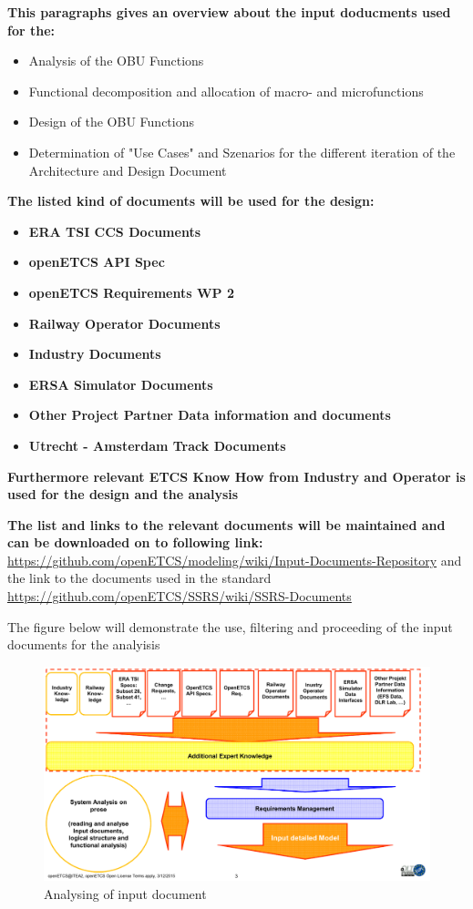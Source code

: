 \textbf{This paragraphs gives an overview about the input doducments used for the:}
\begin{itemize}
\item Analysis of the OBU Functions
\item Functional decomposition and allocation of macro- and microfunctions
\item Design of the OBU Functions
\item Determination of "Use Cases" and Szenarios for the different iteration of the Architecture and Design Document
\end{itemize} 

\textbf{The listed kind of documents will be used for the design:}

\begin{itemize}
\item\textbf{ERA TSI CCS Documents}
\item\textbf{openETCS API Spec}
\item\textbf{openETCS Requirements WP 2}
\item\textbf{Railway Operator Documents}
\item\textbf{Industry Documents}
\item\textbf{ERSA Simulator Documents}
\item\textbf{Other Project Partner Data information and documents}
\item\textbf{Utrecht - Amsterdam Track Documents}
\end{itemize}

\textbf{Furthermore relevant ETCS Know How from Industry and Operator is used for the design and the analysis}

\textbf{The list and links to the relevant documents will be maintained and can be downloaded on to following link:}
\url{https://github.com/openETCS/modeling/wiki/Input-Documents-Repository}
and the link to the documents used in the standard \url{https://github.com/openETCS/SSRS/wiki/SSRS-Documents}

The figure below will demonstrate the use, filtering and proceeding of the input documents for the analyisis\\

\begin{figure}[h]
\includegraphics[scale=0.5]{images/AnalysisDocuments.png}
\caption{Analysing of input document}
\label{Analyising of input document}
\end{figure}